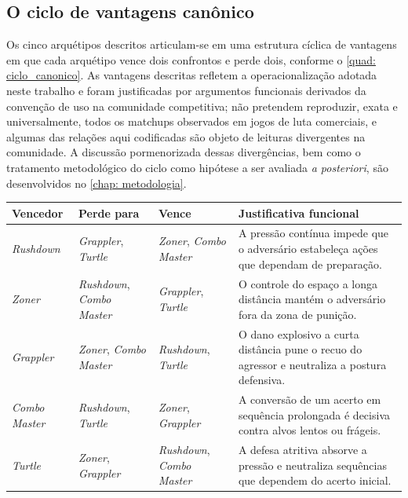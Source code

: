 \subsection{O ciclo de vantagens canônico}

Os cinco arquétipos descritos articulam-se em uma estrutura cíclica de vantagens em que cada arquétipo vence dois confrontos e perde dois, conforme o \autoref{quad: ciclo_canonico}. As vantagens descritas refletem a operacionalização adotada neste trabalho e foram justificadas por argumentos funcionais derivados da convenção de uso na comunidade competitiva; não pretendem reproduzir, exata e universalmente, todos os matchups observados em jogos de luta comerciais, e algumas das relações aqui codificadas são objeto de leituras divergentes na comunidade. A discussão pormenorizada dessas divergências, bem como o tratamento metodológico do ciclo como hipótese a ser avaliada \textit{a posteriori}, são desenvolvidos no \autoref{chap: metodologia}.

\begin{quadro}[ht]
    \caption{Ciclo canônico de vantagens entre os cinco arquétipos adotados.}
    \label{quad: ciclo_canonico}
    \centering

    \begin{tabularx}{\textwidth}{>{\raggedright\arraybackslash}p{2.4cm} >{\raggedright\arraybackslash}p{3.3cm} >{\raggedright\arraybackslash}p{3.3cm} >{\raggedright\arraybackslash}X}
        \hline
        \bfseries Vencedor & \bfseries Perde para & \bfseries Vence & \bfseries Justificativa funcional \\
        \hline
        \textit{Rushdown}     & \textit{Grappler}, \textit{Turtle}     & \textit{Zoner}, \textit{Combo Master}   & A pressão contínua impede que o adversário estabeleça ações que dependam de preparação. \\
        \textit{Zoner}        & \textit{Rushdown}, \textit{Combo Master} & \textit{Grappler}, \textit{Turtle}      & O controle do espaço a longa distância mantém o adversário fora da zona de punição. \\
        \textit{Grappler}     & \textit{Zoner}, \textit{Combo Master}  & \textit{Rushdown}, \textit{Turtle}      & O dano explosivo a curta distância pune o recuo do agressor e neutraliza a postura defensiva. \\
        \textit{Combo Master} & \textit{Rushdown}, \textit{Turtle}     & \textit{Zoner}, \textit{Grappler}       & A conversão de um acerto em sequência prolongada é decisiva contra alvos lentos ou frágeis. \\
        \textit{Turtle}       & \textit{Zoner}, \textit{Grappler}      & \textit{Rushdown}, \textit{Combo Master} & A defesa atritiva absorve a pressão e neutraliza sequências que dependem do acerto inicial. \\
        \hline
    \end{tabularx}

    \source
\end{quadro}

